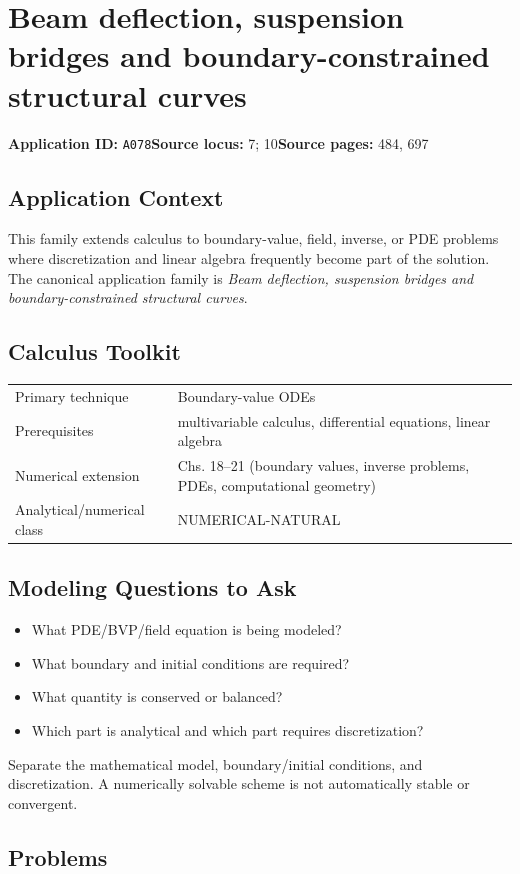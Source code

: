 \documentclass[11pt]{book}
\newcommand{\pid}[1]{\texttt{#1}}
\begin{document}
\chapter{Beam deflection, suspension bridges and boundary-constrained structural curves}\label{app:A078}
\textbf{Application ID:} \pid{A078}\quad \textbf{Source locus:} 7; 10\quad \textbf{Source pages:} 484, 697
\section*{Application Context}
This family extends calculus to boundary-value, field, inverse, or PDE problems where discretization and linear algebra frequently become part of the solution. The canonical application family is \emph{Beam deflection, suspension bridges and boundary-constrained structural curves}.
\section*{Calculus Toolkit}
\begin{tabularx}{\textwidth}{@{}lX@{}}\toprule
Primary technique & Boundary-value ODEs \\
Prerequisites & multivariable calculus, differential equations, linear algebra \\
Numerical extension & Chs. 18–21 (boundary values, inverse problems, PDEs, computational geometry) \\
Analytical/numerical class & NUMERICAL-NATURAL \\
\bottomrule\end{tabularx}
\section*{Modeling Questions to Ask}\begin{itemize}
\item What PDE/BVP/field equation is being modeled?
\item What boundary and initial conditions are required?
\item What quantity is conserved or balanced?
\item Which part is analytical and which part requires discretization?
\end{itemize}
\begin{errorbox}Separate the mathematical model, boundary/initial conditions, and discretization. A numerically solvable scheme is not automatically stable or convergent.\end{errorbox}
\section*{Problems}
\end{document}
